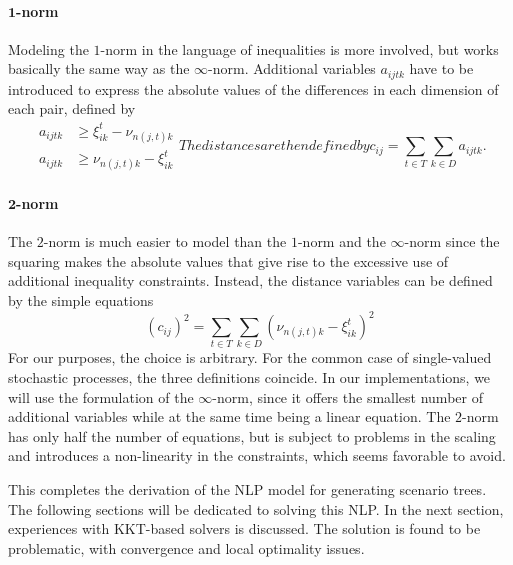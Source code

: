 \paragraph{$\mathbf{1}$-norm} Modeling the $1$-norm in the language of inequalities is more involved, but works basically the same way as the $\infty$-norm. Additional variables $a_{ijtk}$ have to be introduced to express the absolute values of the differences in each dimension of each pair, defined by
\begin{subequations}
\begin{align}
  \label{eq:c-as-1norm-def-a}
  a_{ijtk} &\geq  \xi_{ik}^t - \nu_{n(j,t)k} \\
  a_{ijtk} &\geq  \nu_{n(j,t)k} - \xi_{ik}^t
\end{align}
The distances are then defined by
\begin{equation}
  \label{eq:c-as-1norm}
  c_{ij} = \sum_{t\in T}\sum_{k \in D} a_{ijtk}.
\end{equation}
\end{subequations}
\paragraph{$\mathbf{2}$-norm} The $2$-norm is much easier to model than the $1$-norm and the $\infty$-norm since the squaring makes the absolute values that give rise to the excessive use of additional inequality constraints.
Instead, the distance variables can be defined by the simple equations
\begin{equation}
  \label{eq:c-as-2norm}
  \left(c_{ij} \right)^2 = \sum_{t\in T}\sum_{k \in D}\left( \nu_{n(j,t)k} - \xi_{ik}^t \right)^2
\end{equation}
For our purposes, the choice is arbitrary.
For the common case of single-valued stochastic processes, the three definitions coincide.
In our implementations, we will use the formulation of the $\infty$-norm, since it offers the smallest number of additional variables while at the same time being a linear equation.
The $2$-norm has only half the number of equations, but is subject to problems in the scaling and introduces a non-linearity in the constraints, which seems favorable to avoid.

This completes the derivation of the NLP model for generating scenario trees.
The following sections will be dedicated to solving this NLP.
In the next section, experiences with KKT-based solvers is discussed.
The solution is found to be problematic, with convergence and local optimality issues.
